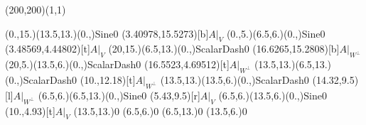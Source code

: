 \unitlength=1bp%

\begin{feynartspicture}(200,200)(1,1)

\FADiagram{}
\FAProp(0.,15.)(13.5,13.)(0.,){Sine}{0}
\FALabel(3.40978,15.5273)[b]{$A|_V$}
\FAProp(0.,5.)(6.5,6.)(0.,){Sine}{0}
\FALabel(3.48569,4.44802)[t]{$A|_V$}
\FAProp(20,15.)(6.5,13.)(0.,){ScalarDash}{0}
\FALabel(16.6265,15.2808)[b]{$A|_{W^\perp}$}
\FAProp(20,5.)(13.5,6.)(0.,){ScalarDash}{0}
\FALabel(16.5523,4.69512)[t]{$A|_{W^\perp}$}
\FAProp(13.5,13.)(6.5,13.)(0.,){ScalarDash}{0}
\FALabel(10.,12.18)[t]{$A|_{W^\perp}$}
\FAProp(13.5,13.)(13.5,6.)(0.,){ScalarDash}{0}
\FALabel(14.32,9.5)[l]{$A|_{W^\perp}$}
\FAProp(6.5,6.)(6.5,13.)(0.,){Sine}{0}
\FALabel(5.43,9.5)[r]{$A|_V$}
\FAProp(6.5,6.)(13.5,6.)(0.,){Sine}{0}
\FALabel(10.,4.93)[t]{$A|_V$}
\FAVert(13.5,13.){0}
\FAVert(6.5,6.){0}
\FAVert(6.5,13.){0}
\FAVert(13.5,6.){0}
\end{feynartspicture}

